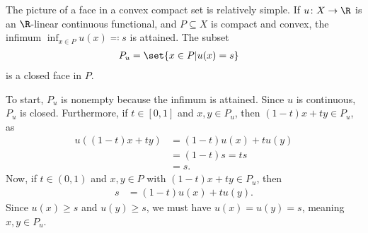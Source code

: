 \documentclass[10pt]{mypackage}
\begin{document}
\begin{example}
  The picture of a face in a convex compact set is relatively simple. If $u\colon X\rightarrow \R$ is an $\R$-linear continuous functional, and $P\subseteq X$ is compact and convex, the infimum $\inf_{x\in P}u(x) \eqcolon s$ is attained. The subset
  \begin{align*}
    P_u &= \set{x\in P | u(x) = s}
  \end{align*}
  is a closed face in $P$.\newline

  To start, $P_u$ is nonempty because the infimum is attained. Since $u$ is continuous, $P_u$ is closed. Furthermore, if $t\in [0,1]$ and $x,y\in P_u$, then $\left( 1-t \right)x + ty\in P_u$, as
  \begin{align*}
    u\left( \left( 1-t \right)x + ty \right) &= \left( 1-t \right)u(x) + tu(y)\\
                                             &= \left( 1-t \right)s = ts\\
                                             &= s.
  \end{align*}
  Now, if $t\in (0,1)$ and $x,y\in P$ with $\left( 1-t \right)x + ty\in P_u$, then
  \begin{align*}
    s &= \left( 1-t \right)u(x) + tu(y).
  \end{align*}
  Since $u(x) \geq s$ and $u(y) \geq s$, we must have $u(x) = u(y) = s$, meaning $x,y\in P_u$.
\end{example}
\end{document}
